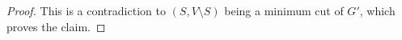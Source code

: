 \documentclass[12pt]{article}
\begin{document}
\begin{enumerate}[1.]
\begin{proof}
    This is a contradiction to $(S, V \setminus S)$ being a minimum cut of $G'$, which proves the claim.

    \end{proof}

    \bigskip
















\end{enumerate}
\end{document}

